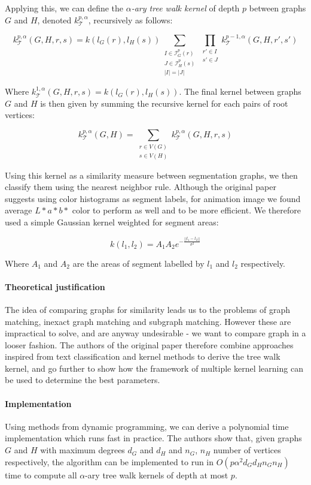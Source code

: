 Applying this, we can define the \emph{$\alpha$-ary tree walk kernel} of depth $p$ between graphs $G$ and $H$, denoted $k^{p, \alpha}_{\mathcal{T}}$, recursively as follows:

\[
k^{p, \alpha}_{\mathcal{T}}(G,H,r,s) = k(l_G(r), l_H(s)) \sum_{\substack{I \in \mathcal{I}_G^p(r)\\ J \in \mathcal{I}_H^p(s)\\ |I| = |J|}} \prod_{\substack{r' \in I \\ s' \in J}} k^{p - 1, \alpha}_{\mathcal{T}}(G,H,r',s')
\]

Where $k^{1, \alpha}_{\mathcal{T}}(G,H,r,s) = k(l_G(r), l_H(s))$. The final kernel between graphs $G$ and $H$ is then given by summing the recursive kernel for each pairs of root vertices:

\[
k^{p, \alpha}_{\mathcal{T}}(G,H) = \sum_{\substack{r \in V(G)\\ s \in V(H)}} k^{p, \alpha}_{\mathcal{T}}(G,H,r,s)
\]

Using this kernel as a similarity measure between segmentation graphs, we then classify them using the nearest neighbor rule. Although the original paper suggests using color histograms as segment labels, for animation image we found average $L*a*b*$ color to perform as well and to be more efficient. We therefore used a simple Gaussian kernel weighted for segment areas:

\[
k(l_1,l_2) = A_1A_2e^{-\frac{||l_1 - l_2||}{\sigma^2}}
\]

Where $A_1$ and $A_2$ are the areas of segment labelled by $l_1$ and $l_2$ respectively.

\paragraph{Theoretical justification} The idea of comparing graphs for similarity leads us to the problems of graph matching, inexact graph matching and subgraph matching. However these are impractical to solve, and are anyway undesirable - we want to compare graph in a looser fashion. The authors of the original paper therefore combine approaches inspired from text classification and kernel methods to derive the tree walk kernel, and go further to show how the framework of multiple kernel learning can be used to determine the best parameters.

\paragraph{Implementation} Using methods from dynamic programming, we can derive a polynomial time implementation which runs fast in practice. The authors show that, given graphs $G$ and $H$ with maximum degrees $d_G$ and $d_H$ and $n_G$, $n_H$ number of vertices respectively, the algorithm can be implemented to run in $O(p\alpha^2d_Gd_Hn_Gn_H)$ time to compute all $\alpha$-ary tree walk kernels of depth at most $p$.

